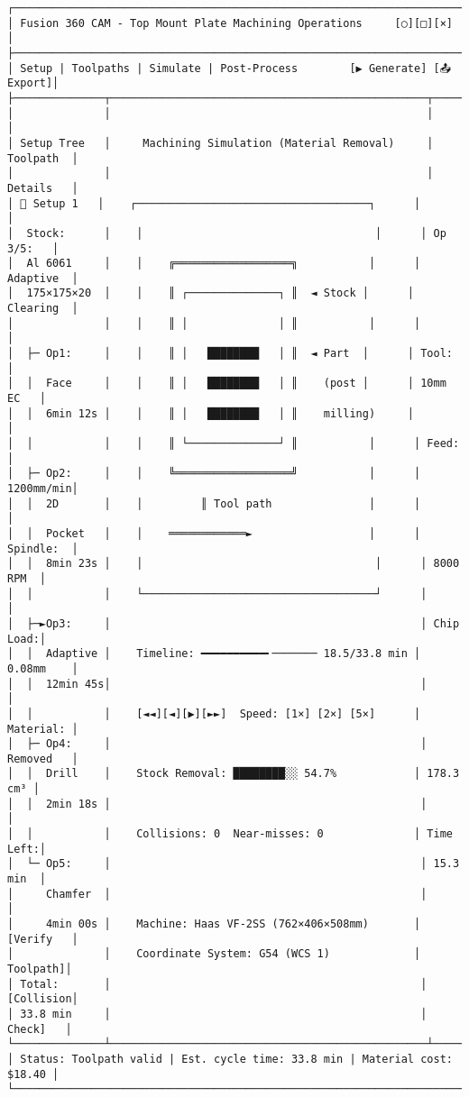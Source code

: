 \documentclass[
]{article}
\begin{document}
\begin{verbatim}
┌────────────────────────────────────────────────────────────────────────────┐
│ Fusion 360 CAM - Top Mount Plate Machining Operations     [○][□][×]        │
├────────────────────────────────────────────────────────────────────────────┤
│ Setup | Toolpaths | Simulate | Post-Process        [▶ Generate] [📤 Export]│
├──────────────┬─────────────────────────────────────────────────┬───────────┤
│              │                                                 │           │
│ Setup Tree   │     Machining Simulation (Material Removal)     │ Toolpath  │
│              │                                                 │ Details   │
│ 🔧 Setup 1   │    ┌────────────────────────────────────┐      │           │
│  Stock:      │    │                                    │      │ Op 3/5:   │
│  Al 6061     │    │    ╔══════════════════╗           │      │ Adaptive  │
│  175×175×20  │    │    ║ ┌──────────────┐ ║  ◄ Stock │      │ Clearing  │
│              │    │    ║ │              │ ║           │      │           │
│  ├─ Op1:     │    │    ║ │   ████████   │ ║  ◄ Part  │      │ Tool:     │
│  │  Face     │    │    ║ │   ████████   │ ║    (post │      │ 10mm EC   │
│  │  6min 12s │    │    ║ │   ████████   │ ║    milling)     │           │
│  │           │    │    ║ └──────────────┘ ║           │      │ Feed:     │
│  ├─ Op2:     │    │    ╚══════════════════╝           │      │ 1200mm/min│
│  │  2D       │    │         ║ Tool path               │      │           │
│  │  Pocket   │    │    ════════════►                  │      │ Spindle:  │
│  │  8min 23s │    │                                    │      │ 8000 RPM  │
│  │           │    └────────────────────────────────────┘      │           │
│  ├─►Op3:     │                                                │ Chip Load:│
│  │  Adaptive │    Timeline: ━━━━━━━━━━╸─────── 18.5/33.8 min │ 0.08mm    │
│  │  12min 45s│                                                │           │
│  │           │    [◄◄][◄][▶][►►]  Speed: [1×] [2×] [5×]      │ Material: │
│  ├─ Op4:     │                                                │ Removed   │
│  │  Drill    │    Stock Removal: ████████░░ 54.7%            │ 178.3 cm³ │
│  │  2min 18s │                                                │           │
│  │           │    Collisions: 0  Near-misses: 0              │ Time Left:│
│  └─ Op5:     │                                                │ 15.3 min  │
│     Chamfer  │                                                │           │
│     4min 00s │    Machine: Haas VF-2SS (762×406×508mm)       │ [Verify   │
│              │    Coordinate System: G54 (WCS 1)             │  Toolpath]│
│ Total:       │                                                │ [Collision│
│ 33.8 min     │                                                │  Check]   │
└──────────────┴─────────────────────────────────────────────────┴───────────┘
│ Status: Toolpath valid | Est. cycle time: 33.8 min | Material cost: $18.40 │
└────────────────────────────────────────────────────────────────────────────┘
\end{verbatim}
\end{document}
